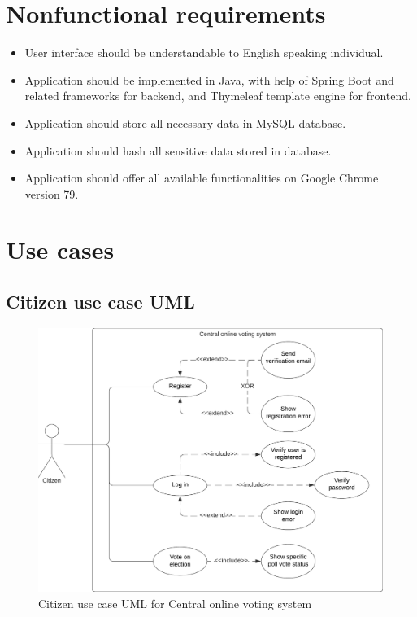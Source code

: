 \documentclass[a4paper,twoside,12pt]{book}
\newcommand{\Title}{Central online voting system}
\begin{document}
  \section{Nonfunctional requirements}
    \begin{itemize}
      \item User interface should be understandable to English speaking individual.
      \item Application should be implemented in Java, with help of Spring Boot and related frameworks for backend, 
      and Thymeleaf template engine for frontend.
      \item Application should store all necessary data in MySQL database.
      \item Application should hash all sensitive data stored in database.
      \item Application should offer all available functionalities on Google Chrome version 79.
    \end{itemize}
  \pagebreak

  \section{Use cases}
    \subsection{Citizen use case UML}
    \begin{figure}[h]
      \includegraphics[width=\linewidth]{citizen_uml.png}
      \caption{Citizen use case UML for \Title}
      \label{fig:citizen_uml}
    \end{figure}
\end{document}
